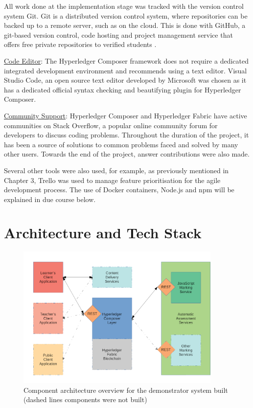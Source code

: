All work done at the implementation stage was tracked with the version control system Git.
Git is a distributed version control system, where repositories can be backed up to a remote server,
such as on the cloud. This is done with GitHub, a git-based version control, code hosting and
project management service that offers free private repositories to verified students \citep{github2018education}.

\underline{Code Editor}: The Hyperledger Composer framework does not require a dedicated integrated
development environment and recommends using a text editor. Visual Studio Code, an open source text editor developed
by Microsoft was chosen as it has a dedicated official syntax checking and beautifying plugin for Hyperledger Composer.

\underline{Community Support}: Hyperledger Composer and Hyperledger Fabric have active communities on Stack Overflow,
a popular online community forum for developers to discuss coding problems. Throughout the duration of the project,
it has been a source of solutions to common problems faced and solved by many other users. Towards the end of the project,
answer contributions were also made.

Several other tools were also used, for example, as previously mentioned in Chapter 3, Trello was used to manage
feature prioritisation for the agile development process. The use of Docker containers, Node.js and npm 
will be explained in due course below.

\section{Architecture and Tech Stack}

\begin{figure}[!ht]
	\centering
	\includegraphics[width=0.9\textwidth]{architecture}
	\caption[Demonstrator Component Architecture]
	{Component architecture overview for the demonstrator system built (dashed lines components were not built)}
	\label{fig:architecture}
\end{figure}

